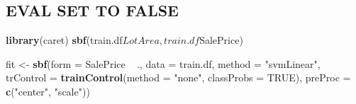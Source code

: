 \documentclass[]{article}
\newenvironment{Shaded}{\begin{snugshade}}{\end{snugshade}}
\newcommand{\KeywordTok}[1]{\textcolor[rgb]{0.13,0.29,0.53}{\textbf{{#1}}}}
\newcommand{\DataTypeTok}[1]{\textcolor[rgb]{0.13,0.29,0.53}{{#1}}}
\newcommand{\DecValTok}[1]{\textcolor[rgb]{0.00,0.00,0.81}{{#1}}}
\newcommand{\StringTok}[1]{\textcolor[rgb]{0.31,0.60,0.02}{{#1}}}
\newcommand{\CommentTok}[1]{\textcolor[rgb]{0.56,0.35,0.01}{\textit{{#1}}}}
\newcommand{\OtherTok}[1]{\textcolor[rgb]{0.56,0.35,0.01}{{#1}}}
\newcommand{\NormalTok}[1]{{#1}}
\begin{document}
\subsection{EVAL SET TO FALSE}\label{eval-set-to-false}

\begin{Shaded}
\end{Shaded}

\begin{Shaded}
\begin{Highlighting}[]
\KeywordTok{library}\NormalTok{(caret)}
\KeywordTok{sbf}\NormalTok{(train.df$LotArea, train.df$SalePrice)}

\NormalTok{fit <-}\StringTok{ }\KeywordTok{sbf}\NormalTok{(}\DataTypeTok{form =} \NormalTok{SalePrice ~}\StringTok{ }\NormalTok{.,}
           \DataTypeTok{data =} \NormalTok{train.df, }
           \DataTypeTok{method =} \StringTok{"svmLinear"}\NormalTok{,}
           \DataTypeTok{trControl =} \KeywordTok{trainControl}\NormalTok{(}\DataTypeTok{method =} \StringTok{"none"}\NormalTok{, }
                                    \DataTypeTok{classProbs =} \OtherTok{TRUE}\NormalTok{),}
           \DataTypeTok{preProc =} \KeywordTok{c}\NormalTok{(}\StringTok{"center"}\NormalTok{, }\StringTok{"scale"}\NormalTok{))}
\end{Highlighting}
\end{Shaded}
\end{document}
